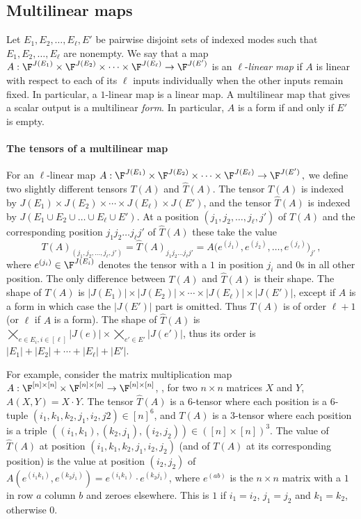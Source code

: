 \subsection{Multilinear maps}

Let $E_1,E_2,\ldots,E_\ell,E'$ be pairwise disjoint sets of indexed modes
such that $E_1,E_2,\ldots,E_\ell$ are nonempty. We say that a map
$
A:\F^{J(E_1)}\times\F^{J(E_2)}\times\cdots \times\F^{J(E_\ell)}
      \rightarrow \F^{J(E')}
$
is an $\ell$-\emph{linear map} if
$A$ is linear with respect to each of its $\ell$ inputs
individually when the other inputs remain fixed.
In particular, a $1$-linear map is a linear map.
A multilinear map that gives a scalar output is a multilinear \emph{form}.
In particular, $A$ is a form if and only if $E'$ is empty.

\paragraph*{The tensors of a multilinear map}

For an $\ell$-linear map
$
A:\F^{J(E_1)}\times\F^{J(E_2)}\times\cdots \times\F^{J(E_\ell)}\rightarrow \F^{J(E')}\,,
$
we define two slightly different tensors $T(A)$ and $\hat{T}(A)$. The tensor $T(A)$ is indexed by $J(E_1) \times J(E_2) \times \cdots \times J(E_\ell) \times J(E')$, and the tensor $\hat{T}(A)$ is indexed by $J(E_1 \cup E_2 \cup \ldots \cup E_\ell \cup E')$.  
At a position $(j_1, j_2, \ldots, j_\ell, j')$ of $T(A)$ and the corresponding position $j_1j_2\ldots j_\ell j'$ of $\hat{T}(A)$ these take the value
\[
T(A)_{(j_1, j_2, \ldots, j_\ell,j')} = \hat{T}(A)_{j_1j_2 \ldots j_\ell j'} =
A\bigl(e^{(j_1)},e^{(j_2)},\ldots,e^{(j_\ell)}\bigr)_{j'}\,,
\]
where $e^{(j_i)} \in \F^{J(E_i)}$ denotes the tensor with a $1$ in
position $j_i$ and $0$s in all other position.
The only difference between
$T(A)$ and $\hat{T}(A)$ is their shape.  The shape of $T(A)$ is
$|J(E_1)| \times |J(E_2)| \times \cdots \times |J(E_\ell)| \times
|J(E')|$,
except if $A$ is a form in which case the $|J(E')|$ part is omitted.
Thus $T(A)$ is of order $\ell+1$ (or $\ell$ if $A$ is a form).  The
shape of $\hat{T}(A)$ is $\bigtimes_{e \in E_i, i \in [\ell]} |J(e)| \times \bigtimes_{e' \in E'} |J(e')|$, thus
its order is $|E_1| + |E_2| + \cdots + |E_\ell| + |E'|$.

For example, consider the matrix multiplication map $A: \F^{[n] \times
  [n]} \times \F^{[n] \times[n]} \rightarrow \F^{[n] \times [n]}$,
\ie, for two $n\times n$ matrices $X$ and $Y$, $A(X, Y) = X \cdot Y$.
The tensor $\hat{T}(A)$ is a $6$-tensor where each position is a
$6$-tuple $(i_1, k_1, k_2, j_1, i_2, j2) \in [n]^6$, and $T(A)$ is a
$3$-tensor where each position is a triple $((i_1, k_1), (k_2, j_1),
(i_2, j_2)) \in ([n] \times [n])^3$.
The value of $\hat{T}(A)$ at position $(i_1, k_1, k_2, j_1, i_2,
j_2)$ (and of $T(A)$ at its corresponding position) is the value at position $(i_2,j_2)$ of
$A(e^{(i_1k_1)}, e^{(k_2j_1)}) = e^{(i_1k_1)}\cdot e^{(k_2j_1)}$, where $e^{(ab)}$ is the
$n\times n$ matrix with a $1$
in row $a$ column $b$ and zeroes elsewhere.  This is $1$ if $i_1 =
i_2$, $j_1=j_2$ and $k_1=k_2$, otherwise $0$.

